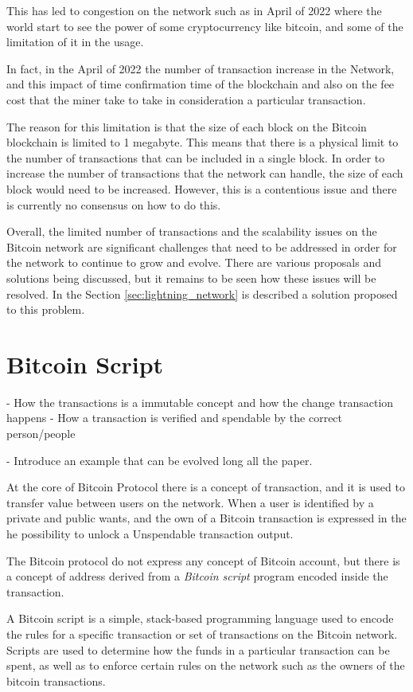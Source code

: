 This has led to congestion on the network such as in April of 2022 where the world start to
see the power of some cryptocurrency like bitcoin, and some of the limitation of it in the usage.

In fact, in the April of 2022 the number of transaction increase in the Network, and this
impact of time confirmation time of the blockchain and also on the fee cost that the miner
take to take in consideration a particular transaction.

The reason for this limitation is that the size of each block on the Bitcoin blockchain is
limited to 1 megabyte. This means that there is a physical limit to the number of transactions
that can be included in a single block. In order to increase the number of transactions
that the network can handle, the size of each block would need to be increased. However,
this is a contentious issue and there is currently no consensus on how to do this.

Overall, the limited number of transactions and the scalability issues on the Bitcoin network
are significant challenges that need to be addressed in order for the network to continue
to grow and evolve. There are various proposals and solutions being discussed,
but it remains to be seen how these issues will be resolved. In the Section \ref{sec:lightning_network}
is described a solution proposed to this problem.


\section{Bitcoin Script}

- How the transactions is a immutable concept and how the change transaction happens
- How a transaction is verified and spendable by the correct person/people

- Introduce an example that can be evolved long all the paper.

At the core of Bitcoin Protocol there is a concept of transaction, and it is used to transfer value
between users on the network. When a user is identified by a private and public wants, and the own of a
Bitcoin transaction is expressed in the he possibility to unlock a Unspendable transaction output.

The Bitcoin protocol do not express any concept of Bitcoin account, but there is a concept of address
derived from a \emph{Bitcoin script} program encoded inside the transaction.

A Bitcoin script is a simple, stack-based programming language used to encode the rules for a specific
transaction or set of transactions on the Bitcoin network. Scripts are used to determine how the
funds in a particular transaction can be spent, as well as to enforce certain rules on the network such as the owners
of the bitcoin transactions.

